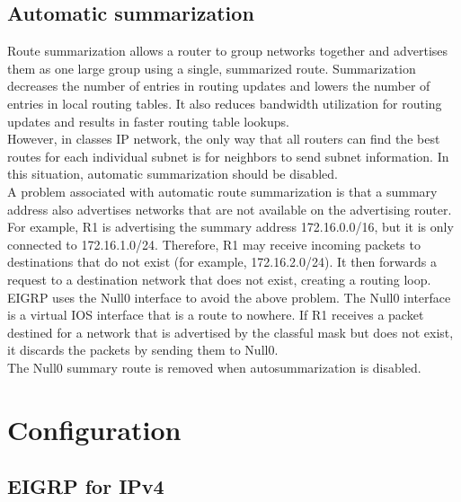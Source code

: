 \subsection{Automatic summarization}

Route summarization allows a router to group networks together and advertises them as one large group using a single, summarized route. Summarization decreases the number of entries in routing updates and lowers the number of entries in local routing tables. It also reduces bandwidth utilization for routing updates and results in faster routing table lookups.\\

However, in classes IP network, the only way that all routers can find the best routes for each individual subnet is for neighbors to send subnet information. In this situation, automatic summarization should be disabled. \\

A problem associated with automatic route summarization is that a summary address also advertises networks that are not available on the advertising router. For example, R1 is advertising the summary address 172.16.0.0/16, but it is only connected to 172.16.1.0/24. Therefore, R1 may receive incoming packets to destinations that do not exist (for example, 172.16.2.0/24). It then forwards a request to a destination network that does not exist, creating a routing loop.\\

EIGRP uses the Null0 interface to avoid the above problem. The Null0 interface is a virtual IOS interface that is a route to nowhere. If R1 receives a packet destined for a network that is advertised by the classful mask but does not exist, it discards the packets by sending them to Null0.\\
 
\note  The Null0 summary route is removed when autosummarization is disabled.

\section{Configuration}

\subsection{EIGRP for IPv4}

